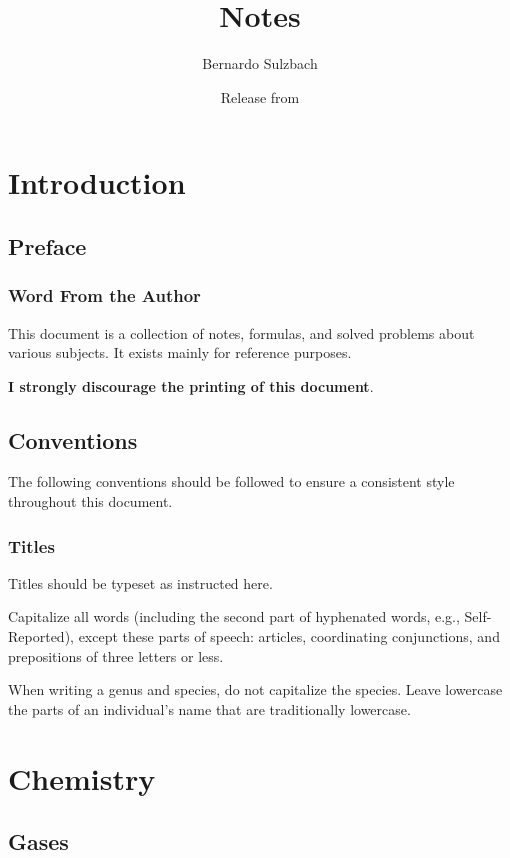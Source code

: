 \documentclass[oneside]{book}
\title{\Huge Notes}
\author{Bernardo Sulzbach}
\date{Release \texttt{\gitFirstTagDescribe} from \gitAuthorDate}
\begin{document}
\hypersetup{pageanchor=false} %
\begin{titlepage}
\maketitle
\end{titlepage}
\hypersetup{pageanchor=true}

\tableofcontents

\part{Introduction}
\chapter{Preface}
\section{Word From the Author}
This document is a collection of notes, formulas, and solved problems about
various subjects. It exists mainly for reference purposes.

\textbf{I strongly discourage the printing of this document}.

\chapter{Conventions}
The following conventions should be followed to ensure a consistent style
throughout this document.

\section{Titles}
Titles should be typeset as instructed here.

Capitalize all words (including the second part of hyphenated words, e.g.,
Self-Reported), except these parts of speech: articles, coordinating
conjunctions, and prepositions of three letters or less.

When writing a genus and species, do not capitalize the species. Leave
lowercase the parts of an individual's name that are traditionally lowercase.

\part{Chemistry}

\chapter{Gases}
\end{document}
